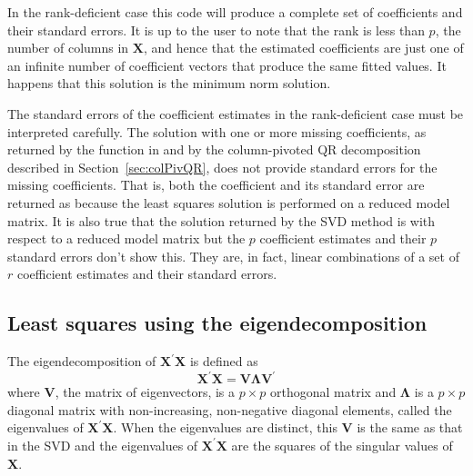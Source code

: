 \documentclass[shortnames,article]{jss}
\begin{document}
In the rank-deficient case this code will produce a complete set of
coefficients and their standard errors.  It is up to the user to note
that the rank is less than $p$, the number of columns in $\bm X$, and
hence that the estimated coefficients are just one of an infinite
number of coefficient vectors that produce the same fitted values.  It
happens that this solution is the minimum norm solution.

The standard errors of the coefficient estimates in the rank-deficient
case must be interpreted carefully.  The solution with one or more missing
coefficients, as returned by the  function in
 and by the column-pivoted QR decomposition described in
Section~\ref{sec:colPivQR}, does not provide standard errors for the
missing coefficients.  That is, both the coefficient and its standard
error are returned as  because the least squares solution is
performed on a reduced model matrix.  It is also true that the
solution returned by the SVD method is with respect to a reduced model
matrix but the $p$ coefficient estimates and their $p$ standard errors
don't show this.  They are, in fact, linear combinations of a set of
$r$ coefficient estimates and their standard errors.

\subsection{Least squares using the eigendecomposition}
\label{sec:eigendecomp}

The eigendecomposition of $\bm X^\prime\bm X$ is defined as
\begin{displaymath}
  \bm X^\prime\bm X=\bm V\bm\Lambda\bm V^\prime
\end{displaymath}
where $\bm V$, the matrix of eigenvectors, is a $p\times p$ orthogonal
matrix and $\bm\Lambda$ is a $p\times p$ diagonal matrix with
non-increasing, non-negative diagonal elements, called the eigenvalues
of $\bm X^\prime\bm X$.  When the eigenvalues are distinct, this $\bm
V$ is the same as that in the SVD and the eigenvalues of $\bm
X^\prime\bm X$ are the squares of the singular values of $\bm X$.
\end{document}
